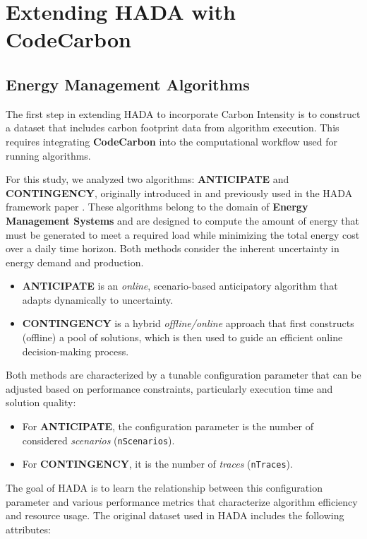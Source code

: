 \documentclass[a4paper,singleside,12pt]{report} %
\begin{document}
\section{Extending HADA with CodeCarbon}

\subsection{Energy Management Algorithms}

The first step in extending HADA to incorporate Carbon Intensity is to construct a dataset that includes carbon footprint data from 
algorithm execution. This requires integrating \textbf{CodeCarbon} into the computational workflow used for running algorithms. 

For this study, we analyzed two algorithms: \textbf{ANTICIPATE} and \textbf{CONTINGENCY}, originally introduced in 
\cite{ijcai2019p150, 10.1007/978-3-319-93031-2_8} and previously used in the HADA framework paper \cite{DEFILIPPO2022109199}. 
These algorithms belong to the domain of \textbf{Energy Management Systems} and are designed to compute the amount of energy 
that must be generated to meet a required load while minimizing the total energy cost over a daily time horizon. Both methods
consider the inherent uncertainty in energy demand and production.

\begin{itemize}
    \item \textbf{ANTICIPATE} is an \textit{online}, scenario-based anticipatory algorithm that adapts dynamically to uncertainty.
    \item \textbf{CONTINGENCY} is a hybrid \textit{offline/online} approach that first constructs (offline) a pool of solutions, 
    which is then used to guide an efficient online decision-making process.
\end{itemize}

Both methods are characterized by a tunable configuration parameter that can be adjusted based on performance constraints, 
particularly execution time and solution quality:
\begin{itemize}
    \item For \textbf{ANTICIPATE}, the configuration parameter is the number of considered \textit{scenarios} (\verb|nScenarios|).
    \item For \textbf{CONTINGENCY}, it is the number of \textit{traces} (\verb|nTraces|).
\end{itemize}

The goal of HADA is to learn the relationship between this configuration parameter and various performance metrics that characterize 
algorithm efficiency and resource usage. The original dataset used in HADA includes the following attributes:
\end{document}

